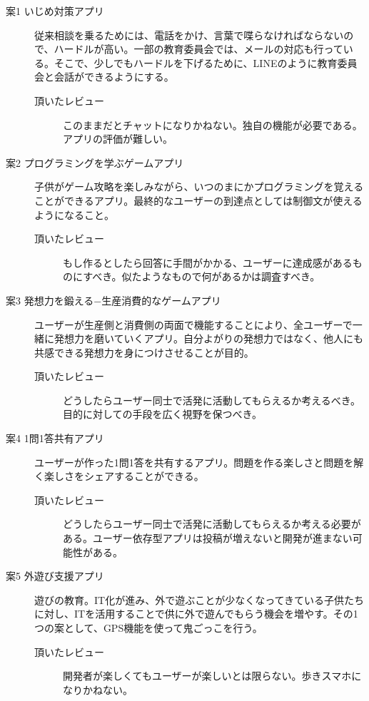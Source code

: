 \documentclass[openany,11pt,papersize]{jsbook}
\begin{document}
\begin{description}
 \item[案1 いじめ対策アプリ]
従来相談を乗るためには、電話をかけ、言葉で喋らなければならないので、ハードルが高い。一部の教育委員会では、メールの対応も行っている。そこで、少しでもハードルを下げるために、LINEのように教育委員会と会話ができるようにする。
	\begin{description}
 	\item[頂いたレビュー]
	このままだとチャットになりかねない。独自の機能が必要である。アプリの評価が難しい。
	 \end{description}
 
  \item[案2 プログラミングを学ぶゲームアプリ]
子供がゲーム攻略を楽しみながら、いつのまにかプログラミングを覚えることができるアプリ。最終的なユーザーの到達点としては制御文が使えるようになること。
	\begin{description}
 	\item[頂いたレビュー]
	もし作るとしたら回答に手間がかかる、ユーザーに達成感があるものにすべき。似たようなもので何があるかは調査すべき。
	 \end{description}

  \item[案3 発想力を鍛える−生産消費的なゲームアプリ]
  ユーザーが生産側と消費側の両面で機能することにより、全ユーザーで一緒に発想力を磨いていくアプリ。自分よがりの発想力ではなく、他人にも共感できる発想力を身につけさせることが目的。
	\begin{description}
 	\item[頂いたレビュー]
	どうしたらユーザー同士で活発に活動してもらえるか考えるべき。目的に対しての手段を広く視野を保つべき。
	 \end{description}
	 
 \item[案4 1問1答共有アプリ]
  ユーザーが作った1問1答を共有するアプリ。問題を作る楽しさと問題を解く楽しさをシェアすることができる。
	\begin{description}
 	\item[頂いたレビュー]
	どうしたらユーザー同士で活発に活動してもらえるか考える必要がある。ユーザー依存型アプリは投稿が増えないと開発が進まない可能性がある。
	 \end{description}
	 
 \item[案5 外遊び支援アプリ]
遊びの教育。IT化が進み、外で遊ぶことが少なくなってきている子供たちに対し、ITを活用することで供に外で遊んでもらう機会を増やす。その1つの案として、GPS機能を使って鬼ごっこを行う。
	\begin{description}
 	\item[頂いたレビュー]
	開発者が楽しくてもユーザーが楽しいとは限らない。歩きスマホになりかねない。
	 \end{description}

 \end{description}
 
\end{document}
